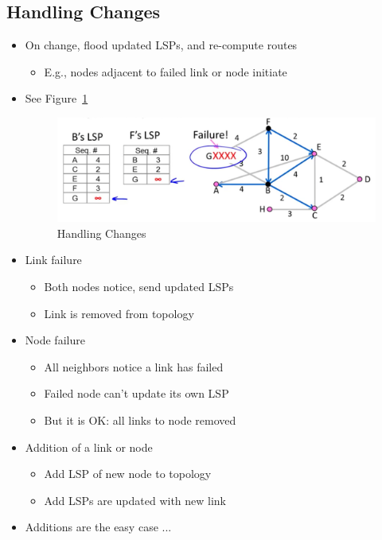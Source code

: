 \documentclass[12pt]{ctexart}   %
\begin{document}
	\subsection{Handling Changes}
	\begin{itemize}
		\item On change, flood updated LSPs, and re-compute routes
		\begin{itemize}
			\item E.g., nodes adjacent to failed link or node initiate
		\end{itemize}
		\item See Figure~\ref{fig:5-6-3}
			
		\begin{figure}[h!] %
		\centering
		 \includegraphics[scale=0.7]{images/5-6-3}
		\caption{ Handling Changes }
		 \label{fig:5-6-3}
		 \end{figure}
		 
		 \item Link failure
		 \begin{itemize}
		 	\item Both nodes notice, send updated LSPs
		 	\item Link is removed from topology
		 \end{itemize}
		 
		 \item Node failure
		 \begin{itemize}
		 	\item All neighbors notice a link has failed
		 	\item Failed node can't update its own LSP
		 	\item But it is OK: all links to node removed
		 \end{itemize}
		 
		 \item Addition of a link or node
		 \begin{itemize}
		 	\item Add LSP of new node to topology
		 	\item Add LSPs are updated with new link
		 \end{itemize}
		 
		 \item Additions are the easy case ...
	\end{itemize}
	
\end{document}
